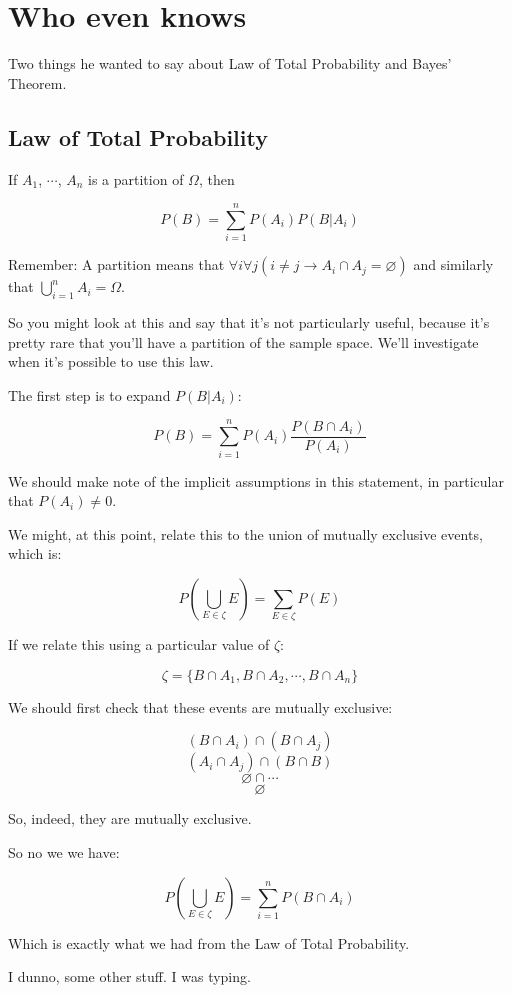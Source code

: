 \documentclass{article}
\begin{document}
\section*{Who even knows}

Two things he wanted to say about Law of Total Probability and Bayes'
Theorem.

\subsection*{Law of Total Probability}

If $A_1$, $\cdots$, $A_n$ is a partition of $\Omega$, then

\[
P(B)=\sum\limits_{i=1}^n P(A_i)P(B|A_i)
\]

Remember: A partition means that
$\forall{}i\forall{}j(i\ne{}j\rightarrow{}A_i\cap A_j=\varnothing)$
and similarly that $\bigcup\limits_{i=1}^nA_i=\Omega$.

So you might look at this and say that it's not particularly useful,
because it's pretty rare that you'll have a partition of the sample
space. We'll investigate when it's possible to use this law.

The first step is to expand $P(B|A_i)$:

\[
P(B)=\sum\limits_{i=1}^nP(A_i)\dfrac{P(B\cap A_i)}{P(A_i)}
\]

We should make note of the implicit assumptions in this statement, in
particular that $P(A_i)\ne{}0$.

We might, at this point, relate this to the union of mutually
exclusive events, which is:

\[
P\left(\bigcup\limits_{E\in\zeta}E\right)=\sum\limits_{E\in\zeta}P(E)
\]

If we relate this using a particular value of $\zeta$:

\[
\zeta=\{B\cap A_1, B\cap A_2,\cdots, B\cap A_n\}
\]

We should first check that these events are mutually exclusive:

\[
(B\cap A_i)\cap (B\cap A_j)
\] \[
(A_i\cap A_j)\cap(B\cap B)
\] \[
\varnothing\cap\cdots
\] \[
\varnothing
\]

So, indeed, they are mutually exclusive.

So no we we have:

\[
P\left(\bigcup\limits_{E\in\zeta}E\right)=\sum_{i=1}^nP(B\cap A_i)
\]

Which is exactly what we had from the Law of Total Probability.

I dunno, some other stuff. I was typing.
\end{document}
